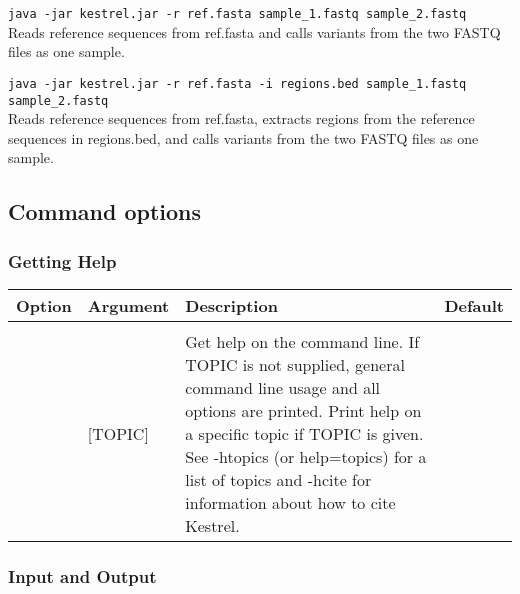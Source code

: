 \texttt{java -jar kestrel.jar -r ref.fasta sample\_1.fastq sample\_2.fastq}\\
\hspace*{1cm}Reads reference sequences from ref.fasta and calls variants from the two FASTQ files as one sample.

\texttt{java -jar kestrel.jar -r ref.fasta -i regions.bed sample\_1.fastq sample\_2.fastq}\\
\hspace*{1cm}Reads reference sequences from ref.fasta, extracts regions from the reference sequences in regions.bed, and calls variants from the two FASTQ files as one sample.


\subsection{Command options}
\label{sec.cmdline.opts}


\subsubsection{Getting Help}
\label{sec.cmdline.opts.help}

\begin{small}
	\begin{longtable}{|p{\optwidth}|p{\argwidth}|p{\dscwidth}|p{}|}
		\hline
		
		\textbf{Option} & \textbf{Argument} & \textbf{Description} & \textbf{Default} \\ \hline
	
		\optbox{\sopt{h}\\\lopt{help}} & [TOPIC] &
		Get help on the command line. If TOPIC is not supplied, general command line usage and all options are printed. Print help on a specific topic if TOPIC is given. See -htopics (or \ddash{}help=topics) for a list of topics and -hcite for information about how to cite Kestrel.
		&
		\\ \hline
		
	\end{longtable}
\end{small}


\subsubsection{Input and Output}
\label{sec.cmdline.opts.io}

